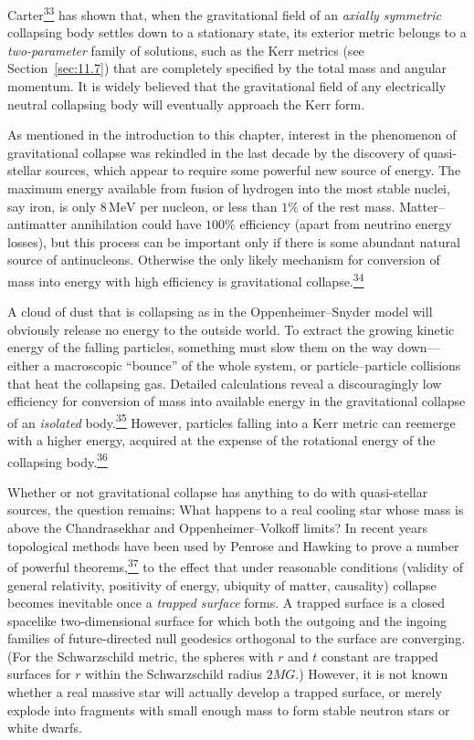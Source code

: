 Carter\hyperref[ch11-ref-33]{\textsuperscript{33}} has shown that, when the
gravitational field of an \emph{axially symmetric} collapsing body settles
down to a stationary state, its exterior metric belongs to a
\emph{two-parameter} family of solutions, such as the Kerr metrics (see
Section~\ref{sec:11.7}) that are completely specified by the total mass and
angular momentum. It is widely believed that the gravitational field of any
electrically neutral collapsing body will eventually approach the Kerr form.

As mentioned in the introduction to this chapter, interest in the phenomenon
of gravitational collapse was rekindled in the last decade by the discovery
of quasi-stellar sources, which appear to require some powerful new source of
energy. The maximum energy available from fusion of hydrogen into the most
stable nuclei, say iron, is only \(8\,\mathrm{MeV}\) per nucleon, or less than
\(1\%\) of the rest mass. Matter--antimatter annihilation could have
\(100\%\) efficiency (apart from neutrino energy losses), but this process can
be important only if there is some abundant natural source of antinucleons.
Otherwise the only likely mechanism for conversion of mass into energy with
high efficiency is gravitational
collapse.\hyperref[ch11-ref-34]{\textsuperscript{34}}

A cloud of dust that is collapsing as in the Oppenheimer--Snyder model will
obviously release no energy to the outside world. To extract the growing
kinetic energy of the falling particles, something must slow them on the way
down---either a macroscopic ``bounce'' of the whole system, or
particle--particle collisions that heat the collapsing gas. Detailed
calculations reveal a discouragingly low efficiency for conversion of mass
into available energy in the gravitational collapse of an \emph{isolated}
body.\hyperref[ch11-ref-35]{\textsuperscript{35}} However, particles falling
into a Kerr metric can reemerge with a higher energy, acquired at the expense
of the rotational energy of the collapsing
body.\hyperref[ch11-ref-36]{\textsuperscript{36}}

Whether or not gravitational collapse has anything to do with quasi-stellar
sources, the question remains: What happens to a real cooling star whose mass
is above the Chandrasekhar and Oppenheimer--Volkoff limits? In recent years
topological methods have been used by Penrose and Hawking to prove a number
of powerful theorems,\hyperref[ch11-ref-37]{\textsuperscript{37}} to the
effect that under reasonable conditions (validity of general relativity,
positivity of energy, ubiquity of matter, causality) collapse becomes
inevitable once a \emph{trapped surface} forms. A trapped surface is a closed
spacelike two-dimensional surface for which both the outgoing and the ingoing
families of future-directed null geodesics orthogonal to the surface are
converging. (For the Schwarzschild metric, the spheres with \(r\) and \(t\)
constant are trapped surfaces for \(r\) within the Schwarzschild radius
\(2MG\).) However, it is not known whether a real massive star will actually
develop a trapped surface, or merely explode into fragments with small enough
mass to form stable neutron stars or white dwarfs.

